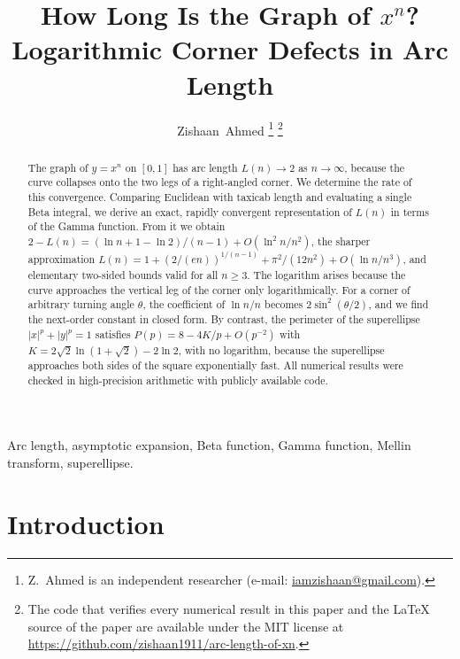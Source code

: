 \documentclass[journal]{IEEEtran}
\begin{document}
\title{How Long Is the Graph of $x^n$?\\ Logarithmic Corner Defects in Arc Length}

\author{Zishaan~Ahmed%
\thanks{Z.~Ahmed is an independent researcher (e-mail:
\href{mailto:iamzishaan@gmail.com}{iamzishaan@gmail.com}).}%
\thanks{The code that verifies every numerical result in this paper and the \LaTeX{}
source of the paper are available under the MIT license at
\url{https://github.com/zishaan1911/arc-length-of-xn}.}}


\maketitle

\begin{abstract}
The graph of $y=x^n$ on $[0,1]$ has arc length $L(n)\to2$ as $n\to\infty$, because the curve
collapses onto the two legs of a right-angled corner. We determine the rate of this
convergence. Comparing Euclidean with taxicab length and evaluating a single Beta
integral, we derive an exact, rapidly convergent representation of $L(n)$ in terms of the
Gamma function. From it we obtain $2-L(n)=(\ln n+1-\ln2)/(n-1)+O(\ln^2 n/n^2)$, the sharper
approximation $L(n)=1+(2/(en))^{1/(n-1)}+\pi^2/(12n^2)+O(\ln n/n^3)$, and elementary two-sided
bounds valid for all $n\ge3$. The logarithm arises because the curve approaches
the vertical leg of the corner only logarithmically. For a corner of arbitrary turning angle
$\theta$, the coefficient of $\ln n/n$ becomes $2\sin^2(\theta/2)$, and we find the next-order
constant in closed form. By contrast, the perimeter of the superellipse $|x|^p+|y|^p=1$
satisfies $P(p)=8-4K/p+O(p^{-2})$ with $K=2\sqrt2\ln(1+\sqrt2)-2\ln2$, with no logarithm,
because the superellipse approaches both sides of the square exponentially fast. All
numerical results were checked in high-precision arithmetic with publicly available code.
\end{abstract}

\begin{IEEEkeywords}
Arc length, asymptotic expansion, Beta function, Gamma function, Mellin transform,
superellipse.
\end{IEEEkeywords}

\section{Introduction}\label{sec:intro}
\end{document}
